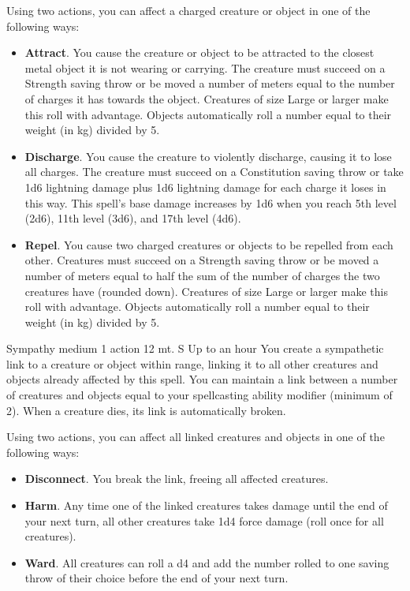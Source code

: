         Using two actions, you can affect a charged creature or object in one of the following ways:
        \begin{itemize}
            \item \textbf{Attract}.
            You cause the creature or object to be attracted to the closest metal object it is not wearing or carrying.
            The creature must succeed on a Strength saving throw or be moved a number of meters equal to the number of charges it has towards the object.
            Creatures of size Large or larger make this roll with advantage.
            Objects automatically roll a number equal to their weight (in kg) divided by 5.
            \item \textbf{Discharge}.
            You cause the creature to violently discharge, causing it to lose all charges.
            The creature must succeed on a Constitution saving throw or take 1d6 lightning damage plus 1d6 lightning damage for each charge it loses in this way.
            This spell's base damage increases by 1d6 when you reach 5th level (2d6), 11th level (3d6), and 17th level (4d6).
            \item \textbf{Repel}.
            You cause two charged creatures or objects to be repelled from each other.
            Creatures must succeed on a Strength saving throw or be moved a number of meters equal to half the sum of the number of charges the two creatures have (rounded down).
            Creatures of size Large or larger make this roll with advantage.
            Objects automatically roll a number equal to their weight (in kg) divided by 5.
        \end{itemize}
        {Sympathy medium}
        {1 action}
        {12 mt.}
        {S}
        {Up to an hour}
        You create a sympathetic link to a creature or object within range, linking it to all other creatures and objects already affected by this spell.
        You can maintain a link between a number of creatures and objects equal to your spellcasting ability modifier (minimum of 2).
        When a creature dies, its link is automatically broken.

        Using two actions, you can affect all linked creatures and objects in one of the following ways:
        \begin{itemize}
            \item \textbf{Disconnect}.
            You break the link, freeing all affected creatures.
            \item \textbf{Harm}.
            Any time one of the linked creatures takes damage until the end of your next turn, all other creatures take 1d4 force damage (roll once for all creatures).
            \item \textbf{Ward}.
            All creatures can roll a d4 and add the number rolled to one saving throw of their choice before the end of your next turn.
        \end{itemize}
